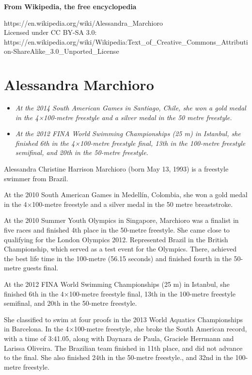 \textbf{From Wikipedia, the free encyclopedia}

https://en.wikipedia.org/wiki/Alessandra\_Marchioro\\
Licensed under CC BY-SA 3.0:\\
https://en.wikipedia.org/wiki/Wikipedia:Text\_of\_Creative\_Commons\_Attribution-ShareAlike\_3.0\_Unported\_License

\section{Alessandra Marchioro}\label{alessandra-marchioro}

\begin{itemize}
\item
  \emph{At the 2014 South American Games in Santiago, Chile, she won a
  gold medal in the 4×100-metre freestyle and a silver medal in the 50
  metre freestyle.}
\item
  \emph{At the 2012 FINA World Swimming Championships (25 m) in
  Istanbul, she finished 6th in the 4×100-metre freestyle final, 13th in
  the 100-metre freestyle semifinal, and 20th in the 50-metre
  freestyle.}
\end{itemize}

Alessandra Christine Harrison Marchioro (born May 13, 1993) is a
freestyle swimmer from Brazil.

At the 2010 South American Games in Medellín, Colombia, she won a gold
medal in the 4×100-metre freestyle and a silver medal in the 50 metre
breaststroke.

At the 2010 Summer Youth Olympics in Singapore, Marchioro was a finalist
in five races and finished 4th place in the 50-metre freestyle. She came
close to qualifying for the London Olympics 2012. Represented Brazil in
the British Championship, which served as a test event for the Olympics.
There, achieved the best life time in the 100-metre (56.15 seconds) and
finished fourth in the 50-metre guests final.

At the 2012 FINA World Swimming Championships (25 m) in Istanbul, she
finished 6th in the 4×100-metre freestyle final, 13th in the 100-metre
freestyle semifinal, and 20th in the 50-metre freestyle.

She classified to swim at four proofs in the 2013 World Aquatics
Championships in Barcelona. In the 4×100-metre freestyle, she broke the
South American record, with a time of 3:41.05, along with Daynara de
Paula, Graciele Herrmann and Larissa Oliveira. The Brazilian team
finished in 11th place, and did not advance to the final. She also
finished 24th in the 50-metre freestyle., and 32nd in the 100-metre
freestyle.

